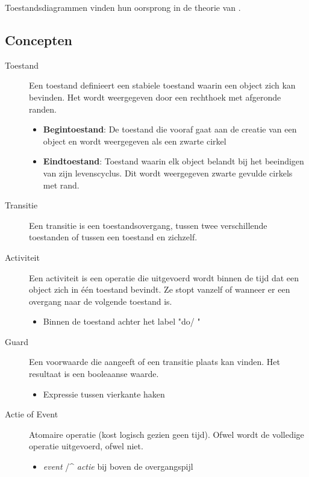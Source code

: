 \documentclass[../../main.tex]{subfiles}
\begin{document}
Toestandsdiagrammen vinden hun oorsprong in de theorie van .
\subsection{Concepten}
\begin{description}
	\item[Toestand] Een toestand definieert een stabiele toestand waarin een object zich kan bevinden. Het wordt weergegeven door een rechthoek met afgeronde randen.
	\begin{itemize}
		\item \textbf{Begintoestand}: De toestand die vooraf gaat aan de creatie van een object en wordt weergegeven als een zwarte cirkel
		\item \textbf{Eindtoestand}: Toestand waarin elk object belandt bij het beeindigen van zijn levenscyclus. Dit wordt weergegeven zwarte gevulde cirkels met rand.
	\end{itemize}
	\item[Transitie] Een transitie is een toestandsovergang, tussen twee verschillende toestanden of tussen een toestand en zichzelf.
	\item[Activiteit] Een activiteit is een operatie die uitgevoerd wordt binnen de tijd dat een object zich in \'e\'en toestand bevindt. Ze stopt vanzelf of wanneer er een overgang naar de volgende toestand is.
	\begin{itemize}
		\item Binnen de toestand achter het label "do/ "
	\end{itemize}
	\item[Guard] Een voorwaarde die aangeeft of een transitie plaats kan vinden. Het resultaat is een booleaanse waarde.
	\begin{itemize}
		\item Expressie tussen vierkante haken
	\end{itemize}
	\item[Actie of Event] Atomaire operatie (kost logisch gezien geen tijd). Ofwel wordt de volledige operatie uitgevoerd, ofwel niet.
	\begin{itemize}
		\item \textit{event} /\^{}  \textit{actie} bij  boven de overgangspijl
	\end{itemize}
\end{description}
\end{document}
